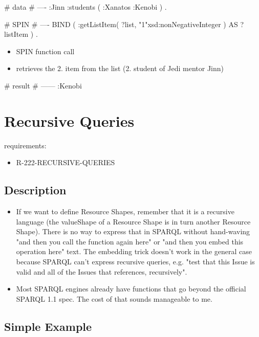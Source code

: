 \documentclass{llncs}
\begin{document}
\begin{ex}
# data
# ----
:Jinn :students 
     ( :Xanatos :Kenobi ) . 
\end{ex}

\begin{ex}
# SPIN
# ----
BIND ( :getListItem( ?list, "1"xsd:nonNegativeInteger ) AS ?listItem ) .
\end{ex}

\begin{itemize}
  \item SPIN function call
	\item retrieves the 2. item from the list (2. student of Jedi mentor Jinn)
\end{itemize}

\begin{ex}
# result
# ------
:Kenobi
\end{ex}

\section{Recursive Queries}

requirements:

\begin{itemize}
	\item R-222-RECURSIVE-QUERIES
\end{itemize}

\subsection{Description}

\begin{itemize}
	\item If we want to define Resource Shapes, remember that it is a recursive
language (the valueShape of a Resource Shape is in turn another
Resource Shape). There is no way to express that in SPARQL without
hand-waving "and then you call the function again here" or "and then
you embed this operation here" text.  The embedding trick doesn't work
in the general case because SPARQL can't express recursive queries,
e.g. "test that this Issue is valid and all of the Issues that
references, recursively".
  \item Most SPARQL engines already have
functions that go beyond the official SPARQL 1.1 spec. The cost of that
sounds manageable to me.
\end{itemize}

\subsection{Simple Example}
\end{document}
